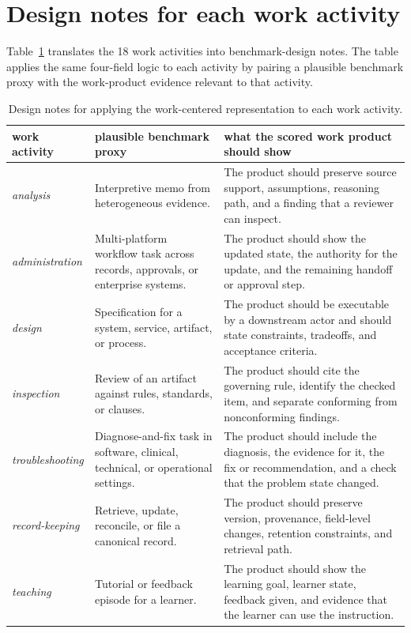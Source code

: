 \documentclass[10pt]{article}
\begin{document}
\section{Design notes for each work activity}
\label{app:opslens}

Table~\ref{tab:opslens} translates the 18 work activities into benchmark-design notes.
The table applies the same four-field logic to each activity by pairing a plausible benchmark proxy with the work-product evidence relevant to that activity.

\begin{table}[!ht]
\caption{Design notes for applying the work-centered representation to each work activity.}
\label{tab:opslens}
\centering
\scriptsize
\begin{tabularx}{\linewidth}{lXX}
\toprule
work activity & plausible benchmark proxy & what the scored work product should show \\
\midrule
\emph{analysis} & Interpretive memo from heterogeneous evidence. & The product should preserve source support, assumptions, reasoning path, and a finding that a reviewer can inspect. \\
\emph{administration} & Multi-platform workflow task across records, approvals, or enterprise systems. & The product should show the updated state, the authority for the update, and the remaining handoff or approval step. \\
\emph{design} & Specification for a system, service, artifact, or process. & The product should be executable by a downstream actor and should state constraints, tradeoffs, and acceptance criteria. \\
\emph{inspection} & Review of an artifact against rules, standards, or clauses. & The product should cite the governing rule, identify the checked item, and separate conforming from nonconforming findings. \\
\emph{troubleshooting} & Diagnose-and-fix task in software, clinical, technical, or operational settings. & The product should include the diagnosis, the evidence for it, the fix or recommendation, and a check that the problem state changed. \\
\emph{record-keeping} & Retrieve, update, reconcile, or file a canonical record. & The product should preserve version, provenance, field-level changes, retention constraints, and retrieval path. \\
\emph{teaching} & Tutorial or feedback episode for a learner. & The product should show the learning goal, learner state, feedback given, and evidence that the learner can use the instruction. \\

\end{tabularx}
\end{table}
\end{document}
